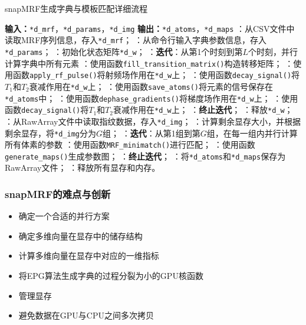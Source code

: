 \documentclass{beamer}
\newcommand{\INDSTATE}[1][1]{\STATE\hspace{#1\algorithmicindent}}
\begin{document}
\begin{frame}
{\begin{minipage}{0.5\linewidth}
	\end{minipage}
	\hspace{1.5cm}
	\begin{minipage}{1.2\linewidth}
	\begin{algorithm}[H]
	\caption{snapMRF生成字典与模板匹配详细流程}
	\label{alg:snapMRF}
	\begin{algorithmic}
		\INDSTATE[-1] \textbf{输入：}\texttt{*d\_mrf}，\texttt{*d\_params}，\texttt{*d\_img}
		\INDSTATE[-1] \textbf{输出：}\texttt{*d\_atoms}，\texttt{*d\_maps}
		：从CSV文件中读取MRF序列信息，存入\texttt{*d\_mrf}；
		：从命令行输入字典参数信息，存入\texttt{*d\_params}；
		：初始化状态矩阵\texttt{*d\_w}；
		：\textbf{迭代}：从第1个时刻到第$L$个时刻，并行计算字典中所有元素
		：\qquad 使用函数\texttt{fill\_transition\_matrix()}构造转移矩阵；
		：\qquad 使用函数\texttt{apply\_rf\_pulse()}将射频场作用在\texttt{*d\_w}上；
		：\qquad 使用函数\texttt{decay\_signal()}将$T_1$和$T_2$衰减作用在\texttt{*d\_w}上；
		：\qquad 使用函数\texttt{save\_atoms()}将元素的信号保存在\texttt{*d\_atoms}中；
		：\qquad 使用函数\texttt{dephase\_gradients()}将梯度场作用在\texttt{*d\_w}上；
		：\qquad 使用函数\texttt{decay\_signal()}将$T_1$和$T_2$衰减作用在\texttt{*d\_w}上；
		：\textbf{终止迭代}；
		：释放\texttt{*d\_w}；
		：从RawArray文件中读取指纹数据，存入\texttt{*d\_img}；
		：计算剩余显存大小，并根据剩余显存，将\texttt{*d\_img}分为$G$组；
		：\textbf{迭代}：从第1组到第$G$组，在每一组内并行计算所有体素的参数
		：\qquad 使用函数\texttt{MRF\_minimatch()}进行匹配；
		：\qquad 使用函数\texttt{generate\_maps()}生成参数图；
		：\textbf{终止迭代}；
		：将\texttt{*d\_atoms}和\texttt{*d\_maps}保存为RawArray文件；
		：释放所有显存和内存。
	\end{algorithmic}
\end{algorithm}
\end{minipage}}
\end{frame}

\begin{frame}
	\frametitle{snapMRF的难点与创新}
	\begin{itemize}
		\item 确定一个合适的并行方案
		\item 确定多维向量在显存中的储存结构
		\item 计算多维向量在显存中对应的一维指标
		\item 将EPG算法生成字典的过程分裂为小的GPU核函数
		\item 管理显存
		\item 避免数据在GPU与CPU之间多次拷贝
	\end{itemize}
\end{frame}
\end{document}
